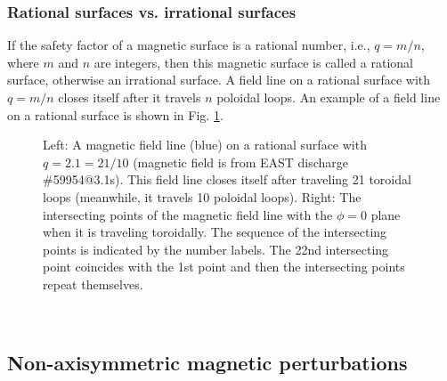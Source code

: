 \documentclass{llncs}
\begin{document}
\subsubsection{Rational surfaces vs. irrational surfaces}

If the safety factor of a magnetic surface is a rational number, i.e., $q = m
/ n$, where $m$ and $n$ are integers, then this magnetic surface is called a
rational surface, otherwise an irrational surface. A field line on a rational
surface with $q = m / n$ closes itself after it travels $n$ poloidal loops. An
example of a field line on a rational surface is shown in Fig. \ref{17-1-1-1}.

\begin{figure}[h]
  \caption{\label{17-1-1-1}Left: A magnetic field line (blue) on a rational
  surface with $q = 2.1 = 21 / 10$ (magnetic field is from EAST discharge
  \#59954@3.1s). This field line closes itself after traveling 21 toroidal
  loops (meanwhile, it travels 10 poloidal loops). Right: The intersecting
  points of the magnetic field line with the $\phi = 0$ plane when it is
  traveling toroidally. The sequence of the intersecting points is indicated
  by the number labels. The 22nd intersecting point coincides with the 1st
  point and then the intersecting points repeat themselves.}
\end{figure}

\

\subsection{Non-axisymmetric magnetic perturbations}
\end{document}

